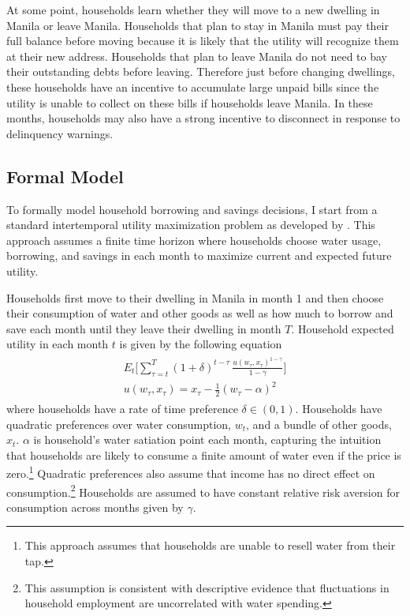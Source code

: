 \documentclass[12pt,table]{article}
\begin{document}
At some point, households learn whether they will move to a new dwelling in Manila or leave Manila.  Households that plan to stay in Manila must pay their full balance before moving because it is likely that the utility will recognize them at their new address.  Households that plan to leave Manila do not need to bay their outstanding debts before leaving.  Therefore just before changing dwellings, these households have an incentive to accumulate large unpaid bills since the utility is unable to collect on these bills if households leave Manila.  In these months, households may also have a strong incentive to disconnect in response to delinquency warnings.

\subsection{Formal Model}

To formally model household borrowing and savings decisions, I start from a standard intertemporal utility maximization problem as developed by \cite{deaton1991saving}.  This approach assumes a finite time horizon where households choose water usage, borrowing, and savings in each month to maximize current and expected future utility.  

Households first move to their dwelling in Manila in month 1 and then choose their consumption of water and other goods as well as how much to borrow and save each month until they leave their dwelling in month $T$.  Household expected utility in each month $t$ is given by the following equation
\begin{align}\label{eq:u}
\begin{split}
E_t \Big[ \sum_{\tau = t}^{T} (1+\delta)^{t-\tau} \,\frac{u(w_{\tau},x_{\tau})^{1-\gamma}}{1-\gamma}   \Big]\\
u(w_{\tau},x_{\tau}) =  x_{\tau} -  \frac{1}{2} (w_{\tau} - \alpha)^2
\end{split} 
\end{align}
where households have a rate of time preference $\delta \in (0,1)$.  Households have quadratic preferences over water consumption, $w_{t}$, and a bundle of other goods, $x_{t}$.  $\alpha$ is household's water satiation point each month, capturing the intuition that households are likely to consume a finite amount of water even if the price is zero.\footnote{This approach assumes that households are unable to resell water from their tap.}  Quadratic preferences also assume that income has no direct effect on consumption.\footnote{This assumption is consistent with descriptive evidence that fluctuations in household employment are uncorrelated with water spending.}  Households are assumed to have constant relative risk aversion for consumption across months given by $\gamma$.
\end{document}
